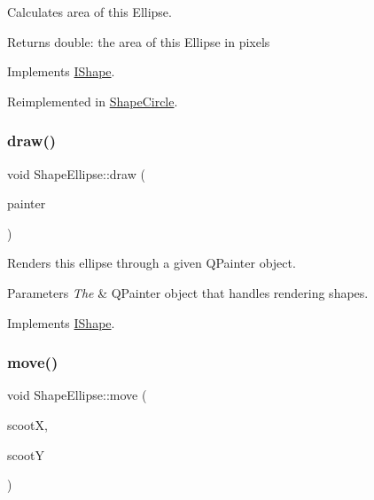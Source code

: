 Calculates area of this Ellipse. 

\begin{DoxyReturn}{Returns}
double\+: the area of this Ellipse in pixels 
\end{DoxyReturn}


Implements \mbox{\hyperlink{class_i_shape_aed742a160acdd13c9cfdeb16e605afea}{I\+Shape}}.



Reimplemented in \mbox{\hyperlink{class_shape_circle_aebc30fb4ad7165778deb75f0bd2d69bd}{Shape\+Circle}}.

\mbox{\label{class_shape_ellipse_ac7f0a33cb5a88c6956f2d876c0c5d313}} 
\subsubsection{\texorpdfstring{draw()}{draw()}}
{\footnotesize\ttfamily void Shape\+Ellipse\+::draw (\begin{DoxyParamCaption}\item[{Q\+Painter \&}]{painter }\end{DoxyParamCaption})\hspace{0.3cm}{\ttfamily [virtual]}}



Renders this ellipse through a given Q\+Painter object. 


\begin{DoxyParams}{Parameters}
{\em The} & Q\+Painter object that handles rendering shapes. \\
\hline
\end{DoxyParams}


Implements \mbox{\hyperlink{class_i_shape_ad97c626e7e2c9afb9f51efc41b836e6f}{I\+Shape}}.

\mbox{\label{class_shape_ellipse_a07ce6783744d01ccebbd5c2c8b4c7d9b}} 
\subsubsection{\texorpdfstring{move()}{move()}}
{\footnotesize\ttfamily void Shape\+Ellipse\+::move (\begin{DoxyParamCaption}\item[{int}]{scootX,  }\item[{int}]{scootY }\end{DoxyParamCaption})\hspace{0.3cm}{\ttfamily [virtual]}}



